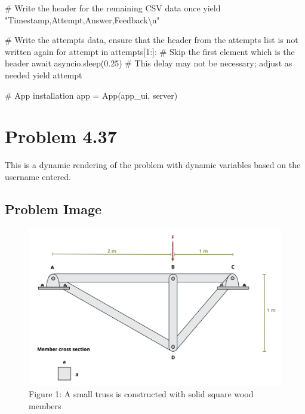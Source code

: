 \documentclass[
  letterpaper,
  DIV=11,
  numbers=noendperiod]{scrreprt}
\newenvironment{Shaded}{\begin{snugshade}}{\end{snugshade}}
\newcommand{\NormalTok}[1]{\textcolor[rgb]{0.00,0.23,0.31}{#1}}
\begin{document}
\begin{Shaded}
\begin{Highlighting}[]
\NormalTok{        \# Write the header for the remaining CSV data once}
\NormalTok{        yield "Timestamp,Attempt,Answer,Feedback\textbackslash{}n"}
        
\NormalTok{        \# Write the attempts data, ensure that the header from the attempts list is not written again}
\NormalTok{        for attempt in attempts[1:]:  \# Skip the first element which is the header}
\NormalTok{            await asyncio.sleep(0.25)  \# This delay may not be necessary; adjust as needed}
\NormalTok{            yield attempt}


\NormalTok{\# App installation}
\NormalTok{app = App(app\_ui, server)}
\end{Highlighting}
\end{Shaded}

\chapter*{Problem 4.37}\label{problem-4.37}


This is a dynamic rendering of the problem with dynamic variables based
on the username entered.

\section*{Problem Image}\label{problem-image-6}


\begin{figure}[H]

{\centering \includegraphics{images/157.png}

}

\caption{Figure 1: A small truss is constructed with solid square wood
members}

\end{figure}%
\end{document}
